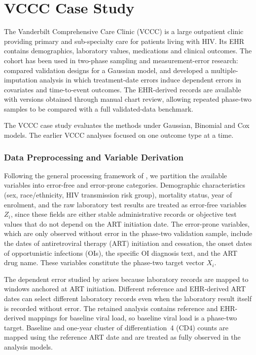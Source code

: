 \section{VCCC Case Study}
\label{sec:sim3context}
The Vanderbilt Comprehensive Care Clinic (VCCC) is a large outpatient clinic providing primary and sub-specialty care for patients living with HIV. Its EHR contains demographics, laboratory values, medications and clinical outcomes. The cohort has been used in two-phase sampling and measurement-error research: \citet{amorim2021two} compared validation designs for a Gaussian model, and \citet{giganti2020accounting} developed a multiple-imputation analysis in which treatment-date errors induce dependent errors in covariates and time-to-event outcomes. The EHR-derived records are available with versions obtained through manual chart review, allowing repeated phase-two samples to be compared with a full validated-data benchmark.

The VCCC case study evaluates the methods under Gaussian, Binomial and Cox models. The earlier VCCC analyses focused on one outcome type at a time.

\subsubsection{Data Preprocessing and Variable Derivation}

Following the general processing framework of \citet{amorim2021two}, we partition the available variables into error-free and error-prone categories. Demographic characteristics (sex, race/ethnicity, HIV transmission risk group), mortality status, year of enrolment, and the raw laboratory test results are treated as error-free variables $Z_i$, since these fields are either stable administrative records or objective test values that do not depend on the ART initiation date. The error-prone variables, which are only observed without error in the phase-two validation sample, include the dates of antiretroviral therapy (ART) initiation and cessation, the onset dates of opportunistic infections (OIs), the specific OI diagnosis text, and the ART drug name. These variables constitute the phase-two target vector $X_i$.

The dependent error studied by \citet{giganti2020accounting} arises because laboratory records are mapped to windows anchored at ART initiation. Different reference and EHR-derived ART dates can select different laboratory records even when the laboratory result itself is recorded without error. The retained analysis contains reference and EHR-derived mappings for baseline viral load, so baseline viral load is a phase-two target. Baseline and one-year cluster of differentiation~4 (CD4) counts are mapped using the reference ART date and are treated as fully observed in the analysis models.

